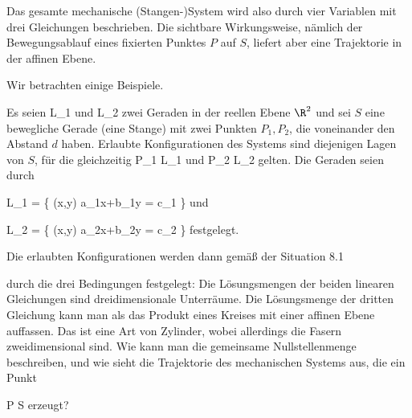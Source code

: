 Das gesamte mechanische (Stangen-)System wird also durch vier Variablen mit drei Gleichungen beschrieben. Die sichtbare Wirkungsweise, nämlich der Bewegungsablauf eines fixierten Punktes $P$ auf $S$, liefert aber eine Trajektorie in der affinen Ebene.

Wir betrachten einige Beispiele.






{





Es seien
\mathkor {} {L_1} {und} {L_2} {}
zwei Geraden in der reellen Ebene $\R^2$ und sei $S$ eine bewegliche Gerade (eine Stange) mit zwei Punkten $P_1,P_2$, die voneinander den Abstand $d$ haben. Erlaubte Konfigurationen des Systems sind diejenigen Lagen von $S$, für die gleichzeitig
\mathkor {} {P_1 \in L_1} {und} {P_2 \in L_2} {}
gelten. Die Geraden seien durch

\mavergleichskette
{\vergleichskette
{ L_1
}
{ = }{ \left\{  (x,y)   \mid   a_1x+b_1y = c_1         \right\}
}
{  }{
}
{    }{
}
{   }{
}
}
{}{}{}
und

\mavergleichskette
{\vergleichskette
{ L_2
}
{ = }{ \left\{  (x,y)   \mid   a_2x+b_2y = c_2         \right\}
}
{  }{
}
{    }{
}
{   }{
}
}
{}{}{}
festgelegt.

Die erlaubten Konfigurationen werden dann gemäß
der
Situation 8.1

durch die drei Bedingungen festgelegt:
Die Lösungsmengen der beiden linearen Gleichungen sind
 {} {}
dreidimensionale Unterräume. Die Lösungsmenge der dritten Gleichung kann man als das Produkt eines Kreises
 {} {}
mit einer affinen Ebene auffassen. Das ist eine Art von Zylinder, wobei allerdings die Fasern zweidimensional sind. Wie kann man die gemeinsame Nullstellenmenge beschreiben, und wie sieht die Trajektorie des mechanischen Systems aus, die ein Punkt

\mavergleichskette
{\vergleichskette
{ P
}
{ \in }{ S
}
{  }{
}
{    }{
}
{   }{
}
}
{}{}{}
erzeugt?

}
